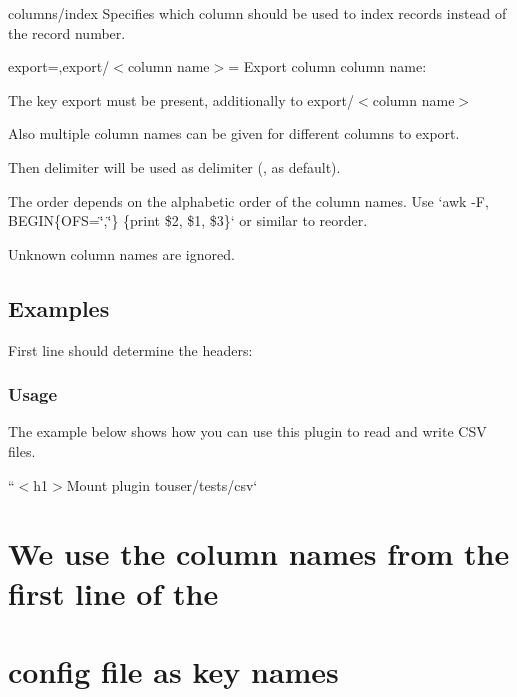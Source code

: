 {\ttfamily columns/index} Specifies which column should be used to index records instead of the record number.

{\ttfamily export=,export/$<$column name$>$=} Export column {\ttfamily column name}\+:


\begin{DoxyItemize}
\item The key {\ttfamily export} must be present, additionally to {\ttfamily export/$<$column name$>$}
\item Also multiple column names can be given for different columns to export.
\begin{DoxyItemize}
\item Then {\ttfamily delimiter} will be used as delimiter ({\ttfamily ,} as default).
\item The order depends on the alphabetic order of the column names. Use `awk -\/F\textquotesingle{},\textquotesingle{} \textquotesingle{}B\+E\+G\+IN\{O\+FS=\char`\"{},\char`\"{}\} \{print \$2, \$1, \$3\}\textquotesingle{}` or similar to reorder.
\item Unknown column names are ignored.
\end{DoxyItemize}
\end{DoxyItemize}

\subsection*{Examples}

First line should determine the headers\+:




\subsubsection*{Usage}

The example below shows how you can use this plugin to read and write C\+SV files.

``{\ttfamily  $<$h1$>$Mount plugin to}user/tests/csv` \section*{We use the column names from the first line of the}

\section*{config file as key names}

